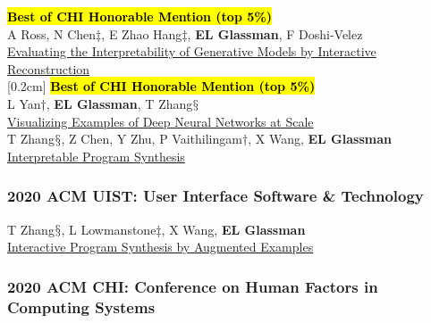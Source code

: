 \documentclass[10pt, a4paper]{article}
\newcommand{\years}[1]{\marginnote{\normalsize #1}}
\begin{document}
\years{\textbf{C20}}\hl{\textbf{Best of CHI Honorable Mention (top 5\%)}}\\
A Ross, N Chen$\ddagger$, E Zhao Hang$\ddagger$, \textbf{EL Glassman}, F Doshi-Velez\\
\href{http://glassmanlab.seas.harvard.edu/papers/evalGenModels_chi2021.pdf}{Evaluating the Interpretability of Generative Models by Interactive Reconstruction}\\
[0.2cm]
\years{\textbf{C19}}\hl{\textbf{Best of CHI Honorable Mention (top 5\%)}}\\ 
L Yan$\dagger$, \textbf{EL Glassman}, T Zhang$\mathsection$\\
\href{http://glassmanlab.seas.harvard.edu/papers/examplenet_chi2021.pdf}{Visualizing Examples of Deep Neural Networks at Scale}\\
[0.2cm]
\years{\textbf{C18}} T Zhang$\mathsection$, Z Chen, Y Zhu, P Vaithilingam$\dagger$, X Wang, \textbf{EL Glassman}\\
\href{http://glassmanlab.seas.harvard.edu/papers/ips_chi2021.pdf}{Interpretable Program Synthesis}


\subsubsection*{2020 ACM \textbf{UIST}: User Interface Software \& Technology }

\years{\textbf{C17}}T Zhang$\mathsection$, L Lowmanstone$\ddagger$, X Wang, \textbf{EL Glassman}\\
\href{http://glassmanlab.seas.harvard.edu/papers/ips_augex_uist20.pdf}{Interactive Program Synthesis by Augmented Examples}

\subsubsection*{2020 ACM \textbf{CHI}: Conference on Human Factors in Computing Systems}
\end{document}
